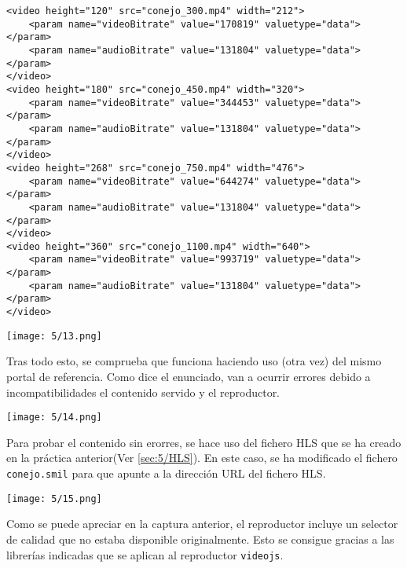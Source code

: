 \begin{verbatim}
<video height="120" src="conejo_300.mp4" width="212">
	<param name="videoBitrate" value="170819" valuetype="data"></param>
	<param name="audioBitrate" value="131804" valuetype="data"></param>
</video>
<video height="180" src="conejo_450.mp4" width="320">
	<param name="videoBitrate" value="344453" valuetype="data"></param>
	<param name="audioBitrate" value="131804" valuetype="data"></param>
</video>
<video height="268" src="conejo_750.mp4" width="476">
	<param name="videoBitrate" value="644274" valuetype="data"></param>
	<param name="audioBitrate" value="131804" valuetype="data"></param>
</video>
<video height="360" src="conejo_1100.mp4" width="640">
	<param name="videoBitrate" value="993719" valuetype="data"></param>
	<param name="audioBitrate" value="131804" valuetype="data"></param>
</video>
\end{verbatim}

\begin{minipage}{\linewidth}
	\centering
	\texttt{[image: 5/13.png]}
	\label{fig:5/13}
\end{minipage}

Tras todo esto, se comprueba que funciona haciendo uso (otra vez) del mismo portal de
referencia. Como dice el enunciado, van a ocurrir errores debido a incompatibilidades
el contenido servido y el reproductor.

\begin{minipage}{\linewidth}
	\centering
	\texttt{[image: 5/14.png]}
	\label{fig:5/14}
\end{minipage}

Para probar el contenido sin erorres, se hace uso del fichero HLS que se ha creado
en la práctica anterior(Ver \ref{sec:5/HLS}). En este caso, se ha modificado el fichero \Verb#conejo.smil#
para que apunte a la dirección URL del fichero HLS{.}

\begin{minipage}{\linewidth}
	\centering
	\texttt{[image: 5/15.png]}
	\label{fig:5/15}
\end{minipage}

Como se puede apreciar en la captura anterior, el reproductor incluye un selector
de calidad que no estaba disponible originalmente. Esto se consigue gracias a las
librerías indicadas que se aplican al reproductor \Verb#videojs#.

